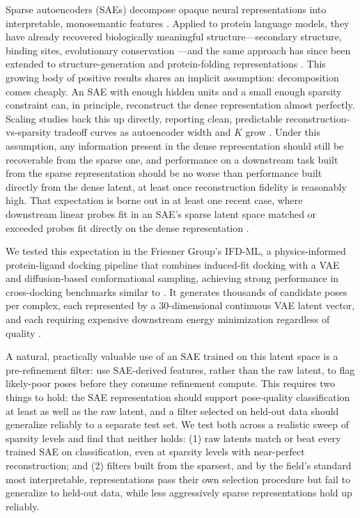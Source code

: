 \documentclass{article}
\begin{document}
Sparse autoencoders (SAEs) decompose opaque neural representations into interpretable, monosemantic features \citep{templeton2024,gao2024,bricken2023}. Applied to protein language models, they have already recovered biologically meaningful structure---secondary structure, binding sites, evolutionary conservation \citep{adams2025,simon2025}---and the same approach has since been extended to structure-generation and protein-folding representations \citep{zarzecki2025,parsan2025,yu2026}. This growing body of positive results shares an implicit assumption: decomposition comes cheaply. An SAE with enough hidden units and a small enough sparsity constraint can, in principle, reconstruct the dense representation almost perfectly. Scaling studies back this up directly, reporting clean, predictable reconstruction-vs-sparsity tradeoff curves as autoencoder width and $K$ grow \citep{gao2024}. Under this assumption, any information present in the dense representation should still be recoverable from the sparse one, and performance on a downstream task built from the sparse representation should be no worse than performance built directly from the dense latent, at least once reconstruction fidelity is reasonably high. That expectation is borne out in at least one recent case, where downstream linear probes fit in an SAE's sparse latent space matched or exceeded probes fit directly on the dense representation \citep{yu2026}.

We tested this expectation in the Friesner Group's IFD-ML, a physics-informed protein-ligand docking pipeline that combines induced-fit docking \citep{sherman2006,miller2021,li2011} with a VAE and diffusion-based conformational sampling, achieving strong performance in cross-docking benchmarks similar to \citet{mansoor2024}. It generates thousands of candidate poses per complex, each represented by a 30-dimensional continuous VAE latent vector, and each requiring expensive downstream energy minimization regardless of quality \citep{li2011}.

A natural, practically valuable use of an SAE trained on this latent space is a pre-refinement filter: use SAE-derived features, rather than the raw latent, to flag likely-poor poses before they consume refinement compute. This requires two things to hold: the SAE representation should support pose-quality classification at least as well as the raw latent, and a filter selected on held-out data should generalize reliably to a separate test set. We test both across a realistic sweep of sparsity levels and find that neither holds: (1) raw latents match or beat every trained SAE on classification, even at sparsity levels with near-perfect reconstruction; and (2) filters built from the sparsest, and by the field's standard most interpretable, representations pass their own selection procedure but fail to generalize to held-out data, while less aggressively sparse representations hold up reliably.
\end{document}
